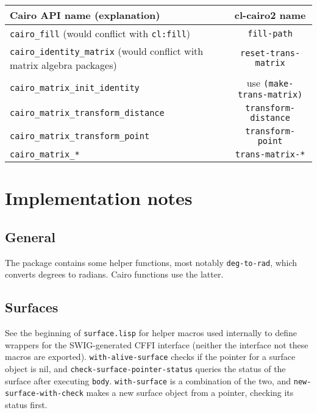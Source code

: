 \documentclass[12pt,letterpaper]{article}
\begin{document}
\begin{table}[htbp]
  \centering
  \begin{tabular}{p{11cm}|c}
    Cairo API name (explanation) & cl-cairo2 name\\\hline
    \verb!cairo_fill! (would conflict with \lstinline!cl:fill!) 
    & \lstinline!fill-path! \\
    \verb!cairo_identity_matrix! (would
    conflict with matrix algebra packages)& \lstinline!reset-trans-matrix! \\
    \verb!cairo_matrix_init_identity! & use \lstinline!(make-trans-matrix)!\\
    \verb!cairo_matrix_transform_distance! 
    & \lstinline!transform-distance!\\
    \verb!cairo_matrix_transform_point! &
    \lstinline!transform-point!\\
    \verb!cairo_matrix_*! & \lstinline!trans-matrix-*!
  \end{tabular}
  \label{tab:naming}
\end{table}



\section{Implementation notes}
\label{sec:implementation-notes}

\subsection{General}
\label{sec:general}

The package contains some helper functions, most notably
\lstinline{deg-to-rad}, which converts degrees to radians.  Cairo
functions use the latter.

\subsection{Surfaces}
\label{sec:surfaces}

See the beginning of \verb!surface.lisp! for helper macros used
internally to define wrappers for the SWIG-generated CFFI interface
(neither the interface not these macros are exported).
\lstinline!with-alive-surface! checks if the pointer for a surface
object is nil, and \lstinline!check-surface-pointer-status! queries
the status of the surface after executing \lstinline!body!.
\lstinline!with-surface! is a combination of the two, and
\lstinline!new-surface-with-check! makes a new surface object from a
pointer, checking its status first.
\end{document}
